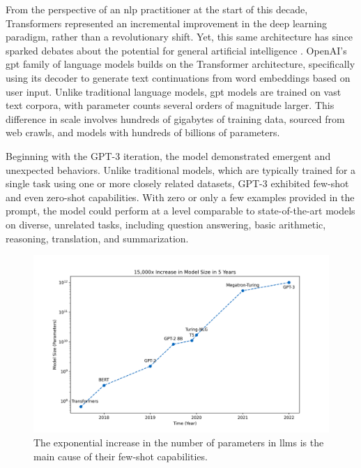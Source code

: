 \pskip

From the perspective of an \gls{nlp} practitioner at the start of this decade, Transformers represented an incremental improvement in the deep learning paradigm, rather than a revolutionary shift. Yet, this same architecture has since sparked debates about the potential for general artificial intelligence \cite{bubeck2023sparksartificialgeneralintelligence}. OpenAI’s \gls{gpt} family of language models builds on the Transformer architecture, specifically using its decoder to generate text continuations from word embeddings based on user input. Unlike traditional language models, \gls{gpt} models are trained on vast text corpora, with parameter counts several orders of magnitude larger. This difference in scale involves hundreds of gigabytes of training data, sourced from web crawls, and models with hundreds of billions of parameters.

\pskip

Beginning with the GPT-3 iteration, the model demonstrated emergent and unexpected behaviors. Unlike traditional models, which are typically trained for a single task using one or more closely related datasets, GPT-3 exhibited few-shot and even zero-shot capabilities. With zero or only a few examples provided in the prompt, the model could perform at a level comparable to state-of-the-art models on diverse, unrelated tasks, including question answering, basic arithmetic, reasoning, translation, and summarization.

\begin{figure}[h!]
    \centering
    \captionsetup{format=plain, font=small, labelfont=bf}
    \includegraphics[width=\linewidth]{figures/modelsizeincrease.png}
    \caption[Progression of Models Size in \glspl{llm}]{The exponential increase in the number of parameters in \glspl{llm} is the main cause of their few-shot capabilities.}
    \label{fig:sample_plot}
\end{figure}

